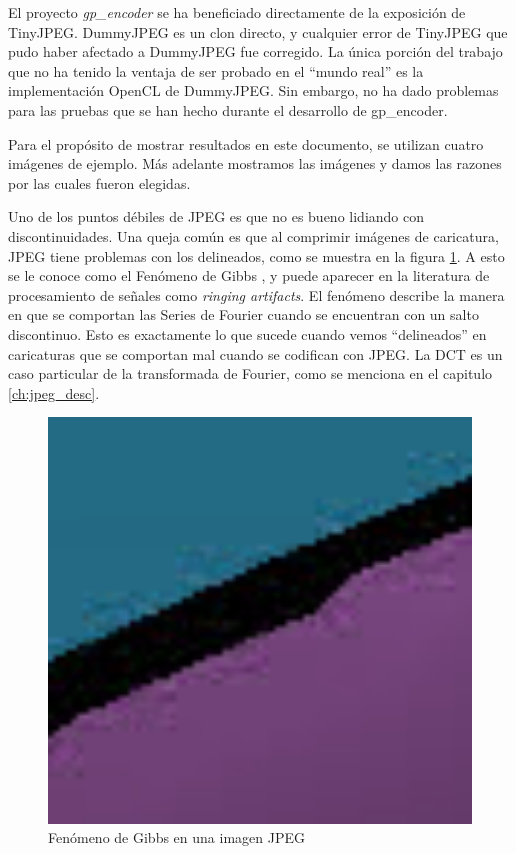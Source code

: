 El proyecto \emph{gp\_encoder} se ha beneficiado directamente de la exposición
de TinyJPEG. DummyJPEG es un clon directo, y cualquier error de TinyJPEG que
pudo haber afectado a DummyJPEG fue corregido. La única porción del trabajo que
no ha tenido la ventaja de ser probado en el ``mundo real'' es la implementación
OpenCL de DummyJPEG. Sin embargo, no ha dado problemas para las pruebas que se
han hecho durante el desarrollo de gp\_encoder.

Para el propósito de mostrar resultados en este documento, se utilizan cuatro
imágenes de ejemplo. Más adelante mostramos las imágenes y damos las razones
por las cuales fueron elegidas.

Uno de los puntos débiles de JPEG es que no es bueno lidiando con
discontinuidades. Una queja común es que al comprimir imágenes de caricatura,
JPEG tiene problemas con los delineados, como se muestra en la figura
\ref{fig:gibbs}. A esto se le conoce como el Fenómeno de Gibbs \cite{gibbs}, y
puede aparecer en la literatura de procesamiento de señales como \emph{ringing
artifacts}. El fenómeno describe la manera en que se comportan las Series de
Fourier cuando se encuentran con un salto discontinuo. Esto es exactamente lo
que sucede cuando vemos ``delineados'' en caricaturas que se comportan mal
cuando se codifican con JPEG. La DCT es un caso particular de la transformada
de Fourier, como se menciona en el capitulo \ref{ch:jpeg_desc}.

\begin{figure}[b]
    \includegraphics[width=1.0\textwidth]{gibbs}
    \caption{Fenómeno de Gibbs en una imagen JPEG}
    \label{fig:gibbs}
\end{figure}

